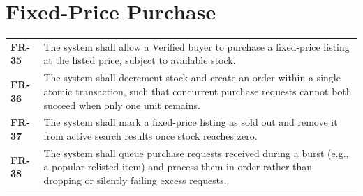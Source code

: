 \documentclass[11pt,a4paper]{report}
\newenvironment{reqtable}{\begin{longtable}{p{2.2cm}p{11.5cm}}}{\end{longtable}}
\begin{document}
\section{Fixed-Price Purchase}
\begin{reqtable}
\textbf{FR-35} & The system shall allow a Verified buyer to purchase a fixed-price listing at the listed price, subject to available stock. \\
\textbf{FR-36} & The system shall decrement stock and create an order within a single atomic transaction, such that concurrent purchase requests cannot both succeed when only one unit remains. \\
\textbf{FR-37} & The system shall mark a fixed-price listing as sold out and remove it from active search results once stock reaches zero. \\
\textbf{FR-38} & The system shall queue purchase requests received during a burst (e.g., a popular relisted item) and process them in order rather than dropping or silently failing excess requests. \\
\end{reqtable}
\end{document}
